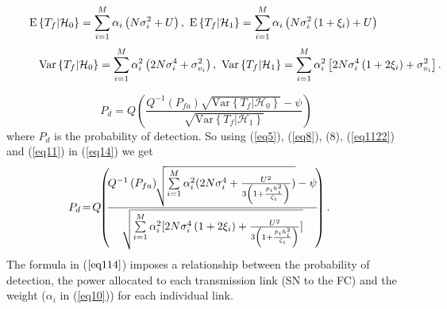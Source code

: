 \documentclass[conference]{IEEEtran}
\begin{document}
\begin{figure*}[h!tb]
\begin{eqnarray}
\hspace{-0.3cm}\mathrm{E}\left\{T_f|\mathcal{ H}_0\right\}=\sum \limits_{i=1}^M \alpha_i \left(N\sigma_i^{2}+U\right), \ \mathrm{E}\left\{T_f|\mathcal{ H}_1\right\}=\sum \limits_{i=1}^M \alpha_i \left(N\sigma_i^{2}\left(1+\xi_i \right)+U\right) \hspace{1.3cm}
\label{eq1122}
\end{eqnarray}
\vspace*{-0.4cm}
\begin{eqnarray}
\mathrm{Var}\left\{T_f|\mathcal{ H}_0\right\}=\sum \limits_{i=1}^M \alpha_i ^{2} \left(2N \sigma_i^{4}+\sigma_{v_i}^{2}\right), \
\mathrm{Var}\left\{T_f|\mathcal{ H}_1\right\}=\sum \limits_{i=1}^M \alpha_i ^{2} \left[ 2N  \sigma_i^{4} \left(1+2\xi_i \right) +\sigma_{v_i}^{2} \right]. 
\hspace*{-0.25cm}
\label{eq11}
\end{eqnarray}
\hrulefill
\vspace*{-12pt}
\end{figure*}

\begin{equation}\label{eq14}
P_d = Q
\left(\frac{Q^{-1}\left(P_{fa}\right) \sqrt {\mathrm{Var} \left\{T_f|\mathcal{ H}_0\right\}} - \psi}{\sqrt {\mathrm{Var}\left\{T_f|\mathcal{ H}_1\right\}}}\right)
\end{equation}
where $P_d$ is the probability of detection.
So using (\ref{eq5}), (\ref{eq8}), (8), (\ref{eq1122}) and (\ref{eq11}) in (\ref{eq14}) we get 
\begin{multline}\label{eq114}
\hspace{-0.45cm}P_d \hspace{-0.05cm}=\hspace{-0.05cm}Q\hspace{-0.1cm}\left(\hspace{-0.1cm}\frac{Q^{-1}\left(P_{fa}\right) \hspace{-0.1cm}\sqrt { \sum \limits_{i=1}^M \alpha_i ^{2} (2N \sigma_i^{4}+\frac{U^{2}}{3\left(1+\frac{p_ih_i^{2}}{\zeta_i}\right)}) } - \psi}{\sqrt {\sum \limits_{i=1}^M \alpha_i ^{2} [ 2N  \sigma_i^{4} \left(1+2\xi_i \right) +\frac{U^{2}}{3\left(1+\frac{p_ih_i^{2}}{\zeta_i}\right)}]}}\hspace{-0.1cm}\right).
\end{multline}
The formula in ($\ref{eq114}$) imposes a relationship between the probability of detection, the power allocated to each transmission link (SN to the FC) and the weight ($\alpha_i$ in (\ref{eq10})) for each individual link. 
\end{document}
